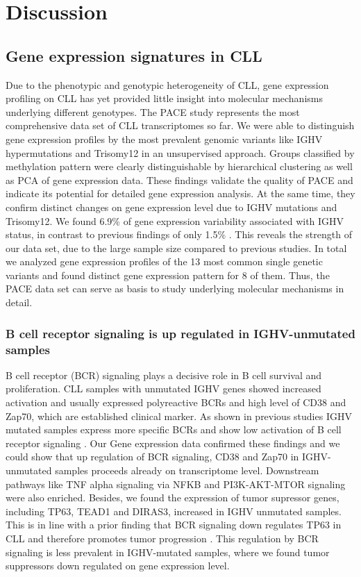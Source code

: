

\section{Discussion}


\subsection{Gene expression signatures in CLL}
Due to the phenotypic and genotypic heterogeneity of CLL, gene expression profiling on CLL has yet provided little insight into molecular mechanisms underlying different genotypes.     
The PACE study represents the most comprehensive data set of CLL transcriptomes so far. We were able to distinguish gene expression profiles by the most prevalent genomic variants like IGHV hypermutations and Trisomy12 in an unsupervised approach. Groups classified by methylation pattern were clearly distinguishable by hierarchical clustering as well as PCA of gene expression data. These findings validate the quality of PACE and indicate its potential for detailed gene expression analysis. At the same time, they confirm distinct changes on gene expression level due to IGHV mutations and Trisomy12. We found 6.9\% of gene expression variability associated with IGHV status, in contrast to previous findings of only 1.5\% \citep{Ferreira2014}. This reveals the strength of our data set, due to the large sample size compared to previous studies.    
In total we analyzed gene expression profiles of the 13 most common single genetic variants and found distinct gene expression pattern for 8 of them. Thus, the PACE data set can serve as basis to study underlying molecular mechanisms in detail. 

\subsubsection{B cell receptor signaling is up regulated in IGHV-unmutated samples}
B cell receptor (BCR) signaling plays a decisive role in B cell survival and proliferation. CLL samples with unmutated IGHV genes showed increased activation and usually expressed polyreactive BCRs and high level of CD38 and Zap70, which are established clinical marker. As shown in previous studies IGHV mutated samples express more specific BCRs and show low activation of B cell receptor signaling \citep{Hacken2016}. Our Gene expression data confirmed these findings and we could show that up regulation of BCR signaling, CD38 and Zap70 in IGHV-unmutated samples proceeds already on transcriptome level. Downstream pathways like TNF alpha signaling via NFKB and PI3K-AKT-MTOR signaling were also enriched. Besides, we found the expression of tumor supressor genes, including TP63, TEAD1 and DIRAS3, increased in IGHV unmutated samples. This is in line with a prior finding that BCR signaling down regulates TP63 in CLL and therefore promotes tumor progression \citep{Humphries2013}. This regulation by BCR signaling is less prevalent in IGHV-mutated samples, where we found tumor suppressors down regulated on gene expression level.  


